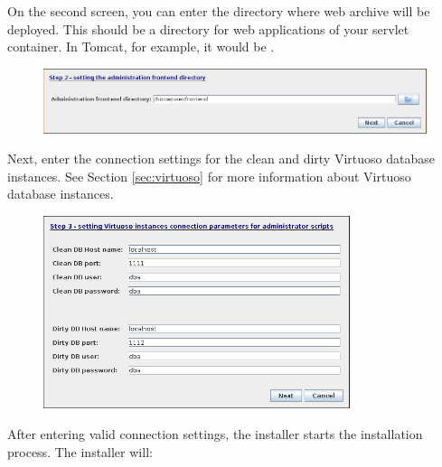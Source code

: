 \FloatBarrier

On the second screen, you can enter the directory where \FE web archive will be deployed. This should be a directory for web applications of your servlet container. In Tomcat, for example, it would be .

\begin{figure}[!h]
    \centering
    \includegraphics[width=\textwidth]{images/install-step-02.png}
\end{figure}

\FloatBarrier

Next, enter the connection settings for the clean and dirty Virtuoso database instances. See Section \ref{sec:virtuoso} for more information about Virtuoso database instances.

\begin{figure}[!h]
    \centering
    \includegraphics[width=0.8\textwidth]{images/install-step-03.png}
\end{figure}

\FloatBarrier

After entering valid connection settings, the installer starts the installation process. The installer will:

